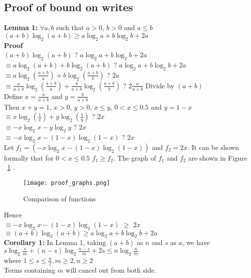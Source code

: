 \begin{appendix}
\section{Proof of bound on writes}
\noindent
\textbf{Lemma 1:}
$\forall a, b$ such that $a>0$, $b>0$ and $a\leq b$\\
$(a+b)\log_2 (a+b) \geq a\log_2 a + b\log_2 b +2a $
\\
\noindent
\textbf{Proof}
\\
$(a+b)\log_2 (a+b)$ ? $a\log_2 a + b\log_2 b +2a $
\\$\equiv a\log_2 (a+b) + b\log_2 (a+b)$ ? $a\log_2 a + b\log_2 b +2a $
\\$\equiv a\log_2 (\frac{a+b}{a}) + b\log_2 (\frac{a+b}{b})$ ? $2a$
\\$\equiv \frac{a}{a+b}\log_2 (\frac{a+b}{a}) + \frac{b}{a+b}\log_2 (\frac{a+b}{b})$ ? $2\frac{a}{a+b}$ {\hfill Divide by $(a+b)$}
\\Define $x=\frac{a}{a+b}$ and $y=\frac{b}{a+b}$
\\Then $x+y=1$, $x>0$, $y>0$, $x\leq y$, $0<x\leq 0.5$ and $y=1-x$
\\$\equiv x\log_2 (\frac{1}{x}) + y\log_2 (\frac{1}{y})$ ? $2x$
\\$\equiv -x\log_2x - y\log_2y$ ? $2x$
\\$\equiv -x\log_2x - (1-x)\log_2(1-x)$ ? $2x$
\\Let $f_1=(-x\log_2x - (1-x)\log_2(1-x))$ and $f_2=2x$. It can be shown formally that for $0<x\leq 0.5$ $f_1 \geq f_2$. The graph of $f_1$ and $f_2$ are shown in
Figure ~\ref{fig:proof_graphs} .

\begin{figure}[htbp]
\texttt{[image: proof\_graphs.png]}\centering
\caption{Comparison of functions}
\label{fig:proof_graphs}
\end{figure}

\noindent Hence
\\$\equiv -x\log_2x - (1-x)\log_2(1-x)$ $\geq$ $2x$
\\$\equiv (a+b)\log_2 (a+b) \geq a\log_2 a + b\log_2 b +2a $
\\


\noindent
\textbf{Corollary 1:}
In Lemma 1, taking $(a+b)$ as $n$ and $s$ as $a$, we have\\
$s \log_2{\frac{s}{m}} + (n-s) \log_2{\frac{n-s}{m}} +2s \leq n \log_2{\frac{n}{m}}$\\
where  $1 \leq s \leq \frac{n}{2}, m \geq 2, n \geq 2$
\\Terms containing $m$ will cancel out from both side.
\\


\end{appendix}
